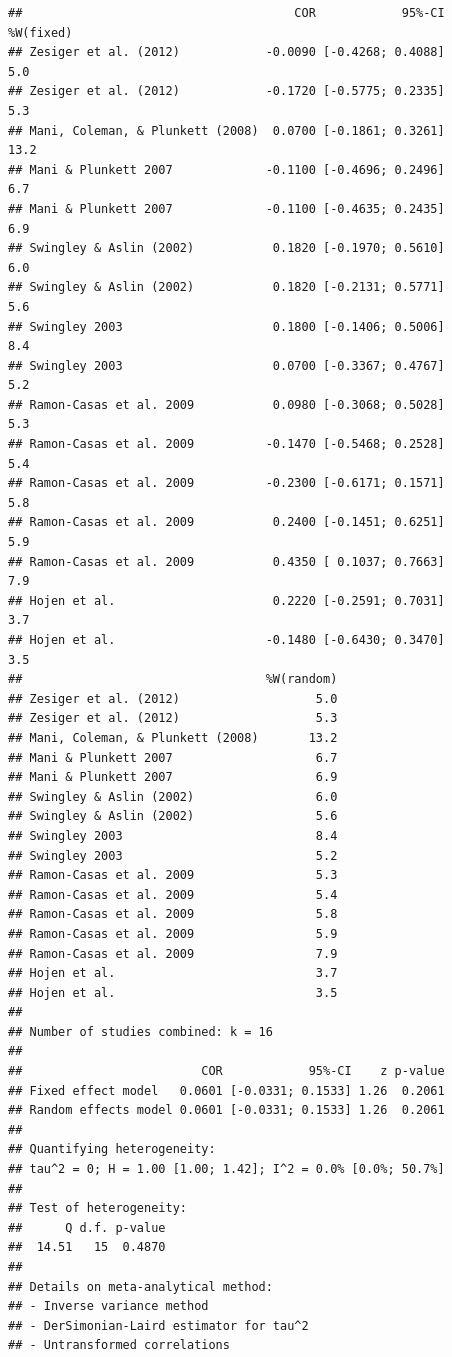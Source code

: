 \documentclass[man]{apa6}
\theoremstyle{definition}
\theoremstyle{definition}
\theoremstyle{definition}
\theoremstyle{remark}
\begin{document}
\begin{verbatim}
##                                      COR            95%-CI %W(fixed)
## Zesiger et al. (2012)            -0.0090 [-0.4268; 0.4088]       5.0
## Zesiger et al. (2012)            -0.1720 [-0.5775; 0.2335]       5.3
## Mani, Coleman, & Plunkett (2008)  0.0700 [-0.1861; 0.3261]      13.2
## Mani & Plunkett 2007             -0.1100 [-0.4696; 0.2496]       6.7
## Mani & Plunkett 2007             -0.1100 [-0.4635; 0.2435]       6.9
## Swingley & Aslin (2002)           0.1820 [-0.1970; 0.5610]       6.0
## Swingley & Aslin (2002)           0.1820 [-0.2131; 0.5771]       5.6
## Swingley 2003                     0.1800 [-0.1406; 0.5006]       8.4
## Swingley 2003                     0.0700 [-0.3367; 0.4767]       5.2
## Ramon-Casas et al. 2009           0.0980 [-0.3068; 0.5028]       5.3
## Ramon-Casas et al. 2009          -0.1470 [-0.5468; 0.2528]       5.4
## Ramon-Casas et al. 2009          -0.2300 [-0.6171; 0.1571]       5.8
## Ramon-Casas et al. 2009           0.2400 [-0.1451; 0.6251]       5.9
## Ramon-Casas et al. 2009           0.4350 [ 0.1037; 0.7663]       7.9
## Hojen et al.                      0.2220 [-0.2591; 0.7031]       3.7
## Hojen et al.                     -0.1480 [-0.6430; 0.3470]       3.5
##                                  %W(random)
## Zesiger et al. (2012)                   5.0
## Zesiger et al. (2012)                   5.3
## Mani, Coleman, & Plunkett (2008)       13.2
## Mani & Plunkett 2007                    6.7
## Mani & Plunkett 2007                    6.9
## Swingley & Aslin (2002)                 6.0
## Swingley & Aslin (2002)                 5.6
## Swingley 2003                           8.4
## Swingley 2003                           5.2
## Ramon-Casas et al. 2009                 5.3
## Ramon-Casas et al. 2009                 5.4
## Ramon-Casas et al. 2009                 5.8
## Ramon-Casas et al. 2009                 5.9
## Ramon-Casas et al. 2009                 7.9
## Hojen et al.                            3.7
## Hojen et al.                            3.5
## 
## Number of studies combined: k = 16
## 
##                         COR            95%-CI    z p-value
## Fixed effect model   0.0601 [-0.0331; 0.1533] 1.26  0.2061
## Random effects model 0.0601 [-0.0331; 0.1533] 1.26  0.2061
## 
## Quantifying heterogeneity:
## tau^2 = 0; H = 1.00 [1.00; 1.42]; I^2 = 0.0% [0.0%; 50.7%]
## 
## Test of heterogeneity:
##      Q d.f. p-value
##  14.51   15  0.4870
## 
## Details on meta-analytical method:
## - Inverse variance method
## - DerSimonian-Laird estimator for tau^2
## - Untransformed correlations
\end{verbatim}
\end{document}

